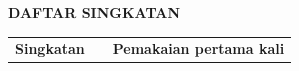 \cleardoublepage
\vspace{2cm}
\begin{center}
{\fontsize{14}{16.8}\selectfont\textbf{DAFTAR SINGKATAN}}\\[1em]
\end{center}
\label{chap:singkatan}
\setcounter{chapter}{0}
\setcounter{section}{0}
\vspace{2em}




\begin{longtable}{@{} l >{\raggedright\arraybackslash}p{7.5cm} c @{}}
\multicolumn{1}{l}{\textbf{Singkatan}} & \multicolumn{1}{l}{\textbf{Deskripsi}} & \multicolumn{1}{l}{\parbox[c]{3.5cm}{\raggedright \textbf{Pemakaian pertama kali}}} \\



\end{longtable}
